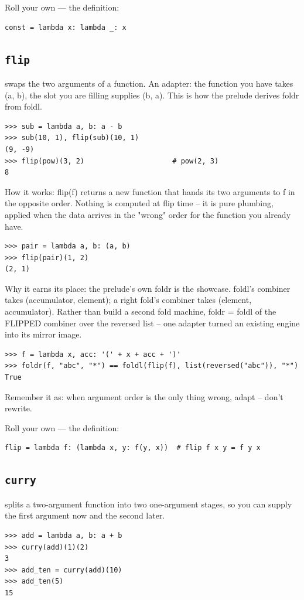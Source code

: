 \documentclass[10pt,letterpaper]{book}
\begin{document}
Roll your own --- the definition:

\begin{lstlisting}[style=ex]
const = lambda x: lambda _: x
\end{lstlisting}
\subsection{\texttt{flip}}\label{def:flip}
swaps the two arguments of a function. An adapter: the function you have takes (a, b), the slot you are filling supplies (b, a). This is how the prelude derives foldr from foldl.
\begin{lstlisting}[style=ex]
>>> sub = lambda a, b: a - b
>>> sub(10, 1), flip(sub)(10, 1)
(9, -9)
>>> flip(pow)(3, 2)                     # pow(2, 3)
8
\end{lstlisting}

How it works: flip(f) returns a new function that hands its two arguments to f in the opposite order. Nothing is computed at flip time -- it is pure plumbing, applied when the data arrives in the "wrong" order for the function you already have.

\begin{lstlisting}[style=ex]
>>> pair = lambda a, b: (a, b)
>>> flip(pair)(1, 2)
(2, 1)
\end{lstlisting}

Why it earns its place: the prelude's own foldr is the showcase. foldl's combiner takes (accumulator, element); a right fold's combiner takes (element, accumulator). Rather than build a second fold machine, foldr = foldl of the FLIPPED combiner over the reversed list -- one adapter turned an existing engine into its mirror image.

\begin{lstlisting}[style=ex]
>>> f = lambda x, acc: '(' + x + acc + ')'
>>> foldr(f, "abc", "*") == foldl(flip(f), list(reversed("abc")), "*")
True
\end{lstlisting}

Remember it as: when argument order is the only thing wrong, adapt -- don't rewrite.


Roll your own --- the definition:

\begin{lstlisting}[style=ex]
flip = lambda f: (lambda x, y: f(y, x))  # flip f x y = f y x
\end{lstlisting}
\subsection{\texttt{curry}}\label{def:curry}
splits a two-argument function into two one-argument stages, so you can supply the first argument now and the second later.
\begin{lstlisting}[style=ex]
>>> add = lambda a, b: a + b
>>> curry(add)(1)(2)
3
>>> add_ten = curry(add)(10)
>>> add_ten(5)
15
\end{lstlisting}
\end{document}
